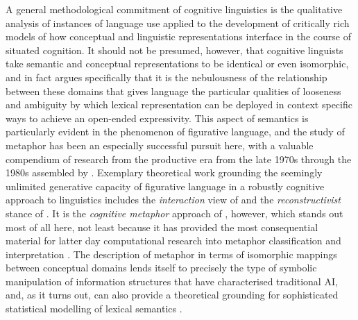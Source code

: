 A general methodological commitment of cognitive linguistics is the qualitative analysis of instances of language use applied to the development of critically rich models of how conceptual and linguistic representations interface in the course of situated cognition.  It should not be presumed, however, that cognitive linguists take semantic and conceptual representations to be identical or even isomorphic, and in fact \cite{Evans2009} argues specifically that it is the nebulousness of the relationship between these domains that gives language the particular qualities of looseness and ambiguity by which lexical representation can be deployed in context specific ways to achieve an open-ended expressivity.  This aspect of semantics is particularly evident in the phenomenon of figurative language, and the study of metaphor has been an especially successful pursuit here, with a valuable compendium of research from the productive era from the late 1970s through the 1980s assembled by \cite{Ortony1993}.  Exemplary theoretical work grounding the seemingly unlimited generative capacity of figurative language in a robustly cognitive approach to linguistics includes the \emph{interaction} view of \cite{Black1977} and the \emph{reconstructivist} stance of \cite{Ortony1975}.  It is the \emph{cognitive metaphor} approach of \cite{LakoffEA1980}, however, which stands out most of all here, not least because it has provided the most consequential material for latter day computational research into metaphor classification and interpretation \citep{Shutova2015}.  The description of metaphor in terms of isomorphic mappings between conceptual domains lends itself to precisely the type of symbolic manipulation of information structures that have characterised traditional AI, and, as it turns out, can also provide a theoretical grounding for sophisticated statistical modelling of lexical semantics \citep{ShutovaEA2013}.

